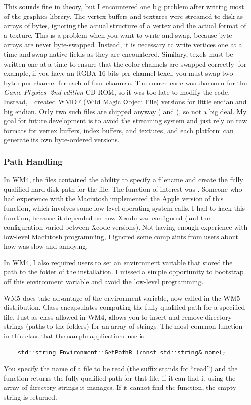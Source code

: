 \documentclass{article}
\begin{document}
This sounds fine in theory, but I encountered one big problem after
writing most of the graphics library.  The vertex buffers and textures
were streamed to disk as arrays of bytes, ignoring the actual structure
of a vertex and the actual format of a texture.  This is a problem when
you want to write-and-swap, because byte arrays are never byte-swapped.
Instead, it is necessary to write vertices one at a time and swap native
fields as they are encountered.  Similary, texels must be written one at
a time to ensure that the color channels are swapped correctly; for
example, if you have an RGBA 16-bits-per-channel texel, you must swap
two bytes per channel for each of four channels.  The source code was
due soon for the {\em Game Physics, 2nd edition} CD-ROM, so it was too
late to modify the code.  Instead, I created WMOF (Wild Magic Object
File) versions for little endian and big endian.  Only two such files
are shipped anyway ( and ),
so not a big deal.  My goal for future development is to avoid the
streaming system and just rely on raw formats for vertex buffers,
index buffers, and textures, and each platform can generate its own
byte-ordered versions.

\subsubsection{Path Handling}

In WM4, the files  contained the ability to specify
a filename and create the fully qualified hard-disk path for the file.
The function of interest was .  Someone who had
experience with the Macintosh implemented the Apple version of this
function, which involves some low-level operating system calls.  I
had to hack this function, because it depended on how Xcode was
configured (and the configuration varied between Xcode versions).
Not having enough experience with low-level Macintosh programming,
I ignored some complaints from users about how  was
slow and annoying.

In WM4, I also required users to set an environment variable that
stored the path to the  folder of the installation.
I missed a simple opportunity to bootstrap off this environment
variable and avoid the low-level programming.

WM5 does take advantage of the environment variable, now called
 in the WM5 distribution.  Class 
encapsulates computing the fully qualified path for a specified file.
Just as class  allowed in WM4, 
allows you to insert and remove directory strings (paths to the
folders) for an array of strings.  The most common function in this
class that the sample applications use is
\begin{verbatim}
    std::string Environment::GetPathR (const std::string& name);
\end{verbatim}
You specify the name of a file to be read (the suffix 
stands for ``read'') and the function returns the fully qualified
path for that file, if it can find it using the array of directory
strings it manages.  If it cannot find the function, the empty
string is returned.
\end{document}
